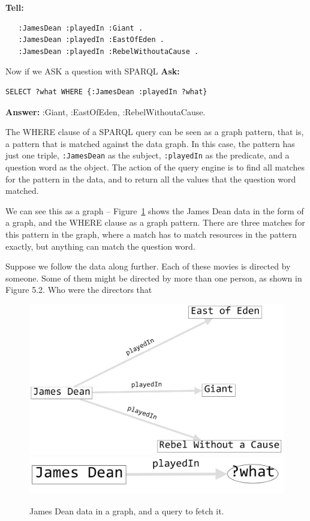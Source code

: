 \textbf{Tell:}
\begin{lstlisting}
   :JamesDean :playedIn :Giant .
   :JamesDean :playedIn :EastOfEden .
   :JamesDean :playedIn :RebelWithoutaCause .
\end{lstlisting}


Now if we ASK a question with SPARQL
\textbf{\textbf{Ask:}} 
\begin{lstlisting}
SELECT ?what WHERE {:JamesDean :playedIn ?what}
\end{lstlisting}
\textbf{\textbf{Answer:}} :Giant, :EastOfEden, :RebelWithoutaCause.

The WHERE clause of a SPARQL query can be seen as a graph pattern, that
is, a pattern that is matched against the data graph. In this case, the
pattern has just one triple, \texttt{:JamesDean} as the subject, \texttt{:playedIn} as the
predicate, and a question word as the object. The action of the query
engine is to find all matches for the pattern in the data, and to return
all the values that the question word matched.

We can see this as a graph -- Figure~\ref{fig:ch06.1} shows the James Dean data in
the form of a graph, and the WHERE clause as a graph pattern. There are
three matches for this pattern in the graph, where a match has to match
resources in the pattern exactly, but anything can match the question
word.

Suppose we follow the data along further. Each of these movies is
directed by someone. Some of them might be directed by more than one
person, as shown in Figure 5.2. Who were the directors that

\begin{figure}
\centering
\includegraphics[width=5in]{SWWOv3/media/ch6/figure6-1a.png}
\includegraphics[width=5in]{SWWOv3/media/ch6/figure6-1b.png}
\label{fig:ch06.1}
\caption{James Dean data in a graph, and a query to fetch it.}
\end{figure}

